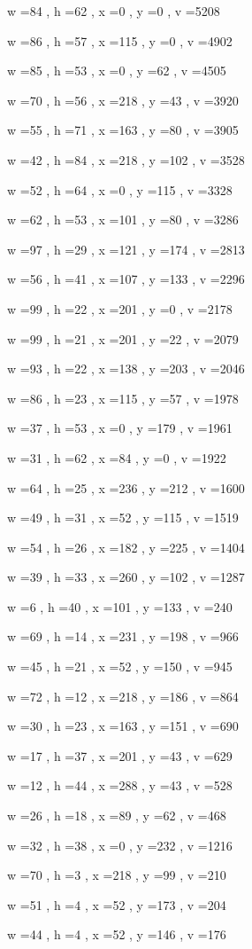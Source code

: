 \documentclass[11pt]{article}
\begin{document}
w =84 , h =62 , x =0 , y =0 , v =5208
\par
w =86 , h =57 , x =115 , y =0 , v =4902
\par
w =85 , h =53 , x =0 , y =62 , v =4505
\par
w =70 , h =56 , x =218 , y =43 , v =3920
\par
w =55 , h =71 , x =163 , y =80 , v =3905
\par
w =42 , h =84 , x =218 , y =102 , v =3528
\par
w =52 , h =64 , x =0 , y =115 , v =3328
\par
w =62 , h =53 , x =101 , y =80 , v =3286
\par
w =97 , h =29 , x =121 , y =174 , v =2813
\par
w =56 , h =41 , x =107 , y =133 , v =2296
\par
w =99 , h =22 , x =201 , y =0 , v =2178
\par
w =99 , h =21 , x =201 , y =22 , v =2079
\par
w =93 , h =22 , x =138 , y =203 , v =2046
\par
w =86 , h =23 , x =115 , y =57 , v =1978
\par
w =37 , h =53 , x =0 , y =179 , v =1961
\par
w =31 , h =62 , x =84 , y =0 , v =1922
\par
w =64 , h =25 , x =236 , y =212 , v =1600
\par
w =49 , h =31 , x =52 , y =115 , v =1519
\par
w =54 , h =26 , x =182 , y =225 , v =1404
\par
w =39 , h =33 , x =260 , y =102 , v =1287
\par
w =6 , h =40 , x =101 , y =133 , v =240
\par
w =69 , h =14 , x =231 , y =198 , v =966
\par
w =45 , h =21 , x =52 , y =150 , v =945
\par
w =72 , h =12 , x =218 , y =186 , v =864
\par
w =30 , h =23 , x =163 , y =151 , v =690
\par
w =17 , h =37 , x =201 , y =43 , v =629
\par
w =12 , h =44 , x =288 , y =43 , v =528
\par
w =26 , h =18 , x =89 , y =62 , v =468
\par
w =32 , h =38 , x =0 , y =232 , v =1216
\par
w =70 , h =3 , x =218 , y =99 , v =210
\par
w =51 , h =4 , x =52 , y =173 , v =204
\par
w =44 , h =4 , x =52 , y =146 , v =176
\par
\newpage
\end{document}

